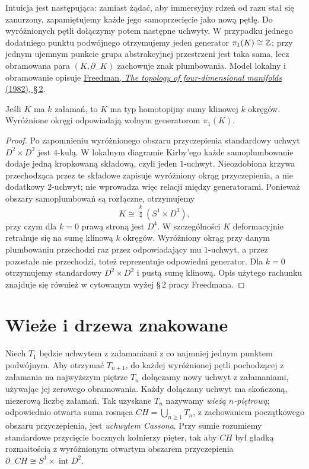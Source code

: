 Intuicja jest następująca: zamiast żądać, aby
immersyjny rdzeń od razu stał się zanurzony, zapamiętujemy
każde jego samoprzecięcie jako nową pętlę. Do
wyróżnionych pętli dołączymy potem następne uchwyty.
W przypadku jednego dodatniego punktu podwójnego
otrzymujemy jeden generator $\pi_1(K)\cong\mathbb{Z}$;
przy jednym ujemnym punkcie grupa abstrakcyjnej
przestrzeni jest taka sama, lecz obramowana para
$(K,\partial_-K)$ zachowuje znak plumbowania.
Model lokalny i obramowanie opisuje
\href{https://www.maths.gla.ac.uk/~mpowell/1982_The%20topology%20of%20four-dimensional%20manifolds.pdf}
{Freedman, \emph{The topology of four-dimensional manifolds}
(1982), \S\,2}.

\begin{stwierdzenie}
\label{prop:casson-first-pi1}
Jeśli $K$ ma $k$ załamań, to $K$ ma typ homotopijny
sumy klinowej $k$ okręgów. Wyróżnione okręgi
odpowiadają wolnym generatorom $\pi_1(K)$.
\end{stwierdzenie}
\begin{proof}
Po zapomnieniu wyróżnionego obszaru przyczepienia
standardowy uchwyt $D^2\times D^2$ jest $4$-kulą.
W lokalnym diagramie Kirby'ego każde samoplumbowanie
dodaje jedną kropkowaną składową, czyli jeden
$1$-uchwyt. Nieozdobiona krzywa przechodząca przez
te składowe zapisuje wyróżniony okrąg przyczepienia,
a nie dodatkowy $2$-uchwyt; nie wprowadza więc relacji
między generatorami. Ponieważ obszary
samoplumbowań są rozłączne, otrzymujemy
\[
 K\cong \mathop{\natural}\limits^k(S^1\times D^3),
\]
przy czym dla $k=0$ prawą stroną jest $D^4$.
W szczególności $K$ deformacyjnie retrahuje się na
sumę klinową $k$ okręgów.
Wyróżniony okrąg przy danym plumbowaniu przechodzi
raz przez odpowiadający mu $1$-uchwyt, a przez
pozostałe nie przechodzi, toteż reprezentuje
odpowiedni generator. Dla $k=0$ otrzymujemy
standardowy $D^2\times D^2$ i pustą sumę klinową.
Opis użytego rachunku znajduje się również w
cytowanym wyżej \S\,2 pracy Freedmana.
\end{proof}

\section{Wieże i drzewa znakowane}
\label{sec:casson-tower}

\begin{definicja}
\label{def:casson-handle}
Niech $T_1$ będzie uchwytem z załamaniami z co
najmniej jednym punktem podwójnym. Aby otrzymać
$T_{n+1}$, do każdej wyróżnionej pętli pochodzącej
z załamania na najwyższym piętrze $T_n$ dołączamy
nowy uchwyt z załamaniami, używając jej zerowego
obramowania. Każdy dołączany uchwyt ma skończoną,
niezerową liczbę załamań. Tak uzyskane $T_n$ nazywamy
\emph{wieżą $n$-piętrową}; odpowiednio otwarta suma
rosnąca $CH=\bigcup_{n\geq1}T_n$, z zachowaniem
początkowego obszaru przyczepienia, jest
\emph{uchwytem Cassona}. Przy sumie rozumiemy
standardowe przycięcie bocznych kołnierzy pięter,
tak aby $CH$ był gładką rozmaitością z wyróżnionym
otwartym obszarem przyczepienia
$\partial_-CH\cong S^1\times\operatorname{int}D^2$.
\end{definicja}

